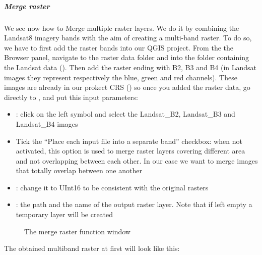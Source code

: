 \documentclass[letterpaper,10pt,english]{sphinxmanual}
\let\sphinxpxdimen\pdfpxdimen\else\newdimen\sphinxpxdimen
\begin{document}
\subparagraph{Merge raster}
\label{\detokenize{raster/merge:merge-raster}}\label{\detokenize{raster/merge::doc}}
We see now how to  Merge multiple raster layers. We do it by combining the Landsat8 imagery bands with the aim of creating a multi-band raster.
To do so, we have to first add the raster bands into our QGIS project. From the the Browser panel, navigate to the raster data folder and into
the folder containing the Landsat data (). Then add the raster ending with B2, B3 and B4
(in Landsat images they represent respectively the blue, green and red channels). These images are already in our prokect CRS ()
so once you added the raster data, go directly to , and put this input parameters:
\begin{itemize}
\item {} 
: click on the left symbol and select the Landsat\_B2, Landsat\_B3 and Landsat\_B4 images

\item {} 
Tick the “Place each input file into a separate band” checkbox: when not activated, this option is used to merge raster layers covering
different area and not overlapping between each other. In our case we want to merge images that totally overlap between one another

\item {} 
: change it to UInt16 to be consistent with the original rasters

\item {} 
: the path and the name of the output raster layer. Note that if left empty a temporary layer will be created

\end{itemize}

\begin{figure}[htbp]
\centering
\capstart

\noindent\sphinxincludegraphics[width=800\sphinxpxdimen]{{4.1_merge_raster}.PNG}
\caption{The merge raster function window}\label{\detokenize{raster/merge:id1}}\end{figure}

The obtained multiband raster at first will look like this:

\noindent{}
\end{document}
